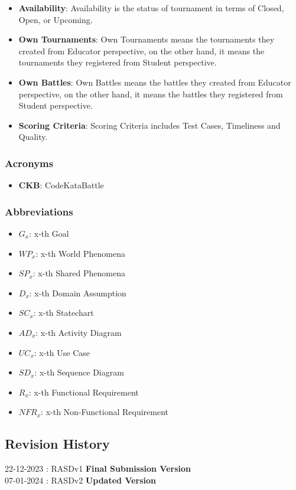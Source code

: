 \begin{itemize}
    \item \textbf{Availability}: Availability is the status of tournament in terms of Closed, Open, or Upcoming.
    \item \textbf{Own Tournaments}: Own Tournaments means the tournaments they created from  Educator perspective, on the other hand, it means the tournaments they registered from  Student perspective.
    \item \textbf{Own Battles}: Own Battles means the battles they created from  Educator perspective, on the other hand, it means the battles they registered from  Student perspective.
    \item \textbf{Scoring Criteria}: Scoring Criteria includes Test Cases, Timeliness and Quality.
    

\end{itemize}

\subsubsection{Acronyms}
\begin{itemize}
    \item \textbf{CKB}: CodeKataBattle
\end{itemize}

\subsubsection{Abbreviations}
\begin{itemize}
    \item $G_{x}$: x-th Goal
    \item $WP_{x}$: x-th World Phenomena
    \item $SP_{x}$: x-th Shared Phenomena
    \item $D_{x}$: x-th Domain Assumption
    \item $SC_{x}$: x-th Statechart
    \item $AD_{x}$: x-th Activity Diagram
    \item $UC_{x}$: x-th Use Case
    \item $SD_{x}$: x-th Sequence Diagram
    \item $R_{x}$: x-th Functional Requirement
    \item $NFR_{x}$: x-th Non-Functional Requirement
\end{itemize}

\subsection{Revision History}
22-12-2023 : RASDv1 \textbf{Final Submission Version} \\
07-01-2024 : RASDv2 \textbf{Updated Version }


